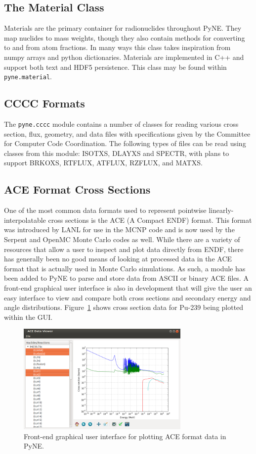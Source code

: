 \documentclass{anstrans}
\begin{document}
\subsection{The Material Class} 
Materials are the primary container for radionuclides throughout PyNE. They map
nuclides to mass weights, though they also contain methods for converting to and
from atom fractions.  In many ways this class takes inspiration from numpy
arrays and python dictionaries.  Materials are implemented in C++ and support
both text and HDF5 persistence.  This class may be found within
\texttt{pyne.material}.


\subsection{CCCC Formats}
The \texttt{pyne.cccc} module contains a number of classes for reading various
cross section, flux, geometry, and data files with specifications given by the
Committee for Computer Code Coordination. The following types of files can be
read using classes from this module: ISOTXS, DLAYXS and SPECTR, with plans to
support BRKOXS, RTFLUX, ATFLUX, RZFLUX, and MATXS.

\subsection{ACE Format Cross Sections}

One of the most common data formats used to represent pointwise
linearly-interpolatable cross sections is the ACE (A Compact ENDF) format. This
format was introduced by LANL for use in the MCNP \cite{mcnp} code and is now
used by the Serpent \cite{serpent} and OpenMC \cite{openmc} Monte Carlo codes as
well. While there are a variety of resources that allow a user to inspect and
plot data directly from ENDF, there has generally been no good means of looking
at processed data in the ACE format that is actually used in Monte Carlo
simulations. As such, a module has been added to PyNE to parse and store data
from ASCII or binary ACE files. A front-end graphical user interface is also in
development that will give the user an easy interface to view and compare both
cross sections and secondary energy and angle
distributions. Figure~\ref{fig:ace-gui} shows cross section data for Pu-239
being plotted within the GUI.
\begin{figure}[ht]
  \centering
  \includegraphics[width=3.3in]{ace-gui.png}
  \caption{Front-end graphical user interface for plotting ACE format data in
    PyNE.}
  \label{fig:ace-gui}
\end{figure}
\end{document}
